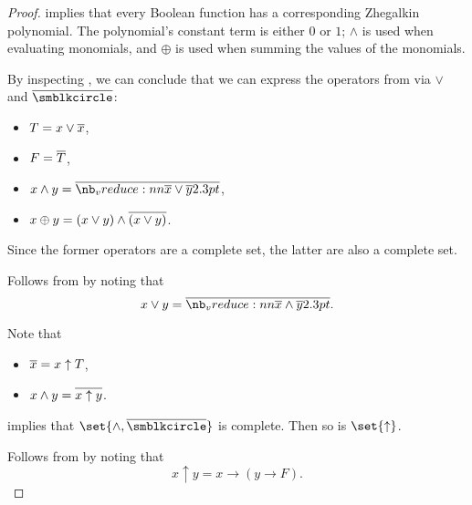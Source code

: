 \begin{proof}
    implies that every Boolean function has a corresponding Zhegalkin polynomial. The polynomial's constant term is either \( 0 \) or \( 1 \); \( \wedge \) is used when evaluating monomials, and \( \oplus \) is used when summing the values of the monomials.

   By inspecting , we can conclude that we can express the operators from  via \( \vee \) and \( \oline{\anon} \):
  \begin{itemize}
    \item \( T = x \vee \oline{x} \),
    \item \( F = \oline{T} \),
    \item \( x \wedge y = \oline*{\oline{x} \vee \oline{y}} \),
    \item \( x \oplus y = (x \vee y) \wedge \oline{(x \vee y)} \).
  \end{itemize}

  Since the former operators are a complete set, the latter are also a complete set.

   Follows from  by noting that
  \begin{equation*}
    x \vee y = \oline*{\oline x \wedge \oline y}.
  \end{equation*}

   Note that
  \begin{itemize}
    \item \( \oline{x} = x \uparrow T \),
    \item \( x \wedge y = \oline{x \uparrow y} \).
  \end{itemize}

   implies that \( \set{ \wedge, \oline{\anon} } \) is complete. Then so is \( \set{ \uparrow } \).

   Follows from  by noting that
  \begin{equation*}
    x \uparrow y = x \rightarrow (y \rightarrow F).
  \end{equation*}
\end{proof}

